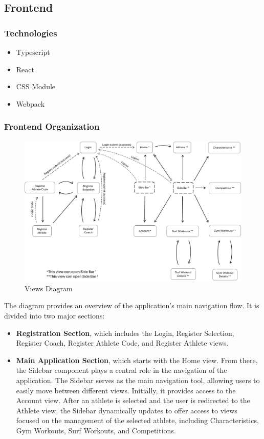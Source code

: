 \documentclass[a4paper,twoside,11pt]{article}
\begin{document}
\subsection{Frontend}

\subsubsection{Technologies}
\begin{itemize}
\item Typescript
\item React
\item CSS Module
\item Webpack
\end{itemize}

\subsubsection{Frontend Organization}

\begin{figure}[H]
\centering
\includegraphics[width=6in]{ViewsDiagram.png}
\caption{Views Diagram}
\end{figure}

The diagram provides an overview of the application's main navigation flow.  
It is divided into two major sections:

\begin{itemize}
\item \textbf{Registration Section}, which includes the Login, Register Selection, Register Coach, Register Athlete Code, and Register Athlete views.
  
\item \textbf{Main Application Section}, which starts with the Home view. From there, the Sidebar component plays a central role in the navigation of the application.  
The Sidebar serves as the main navigation tool, allowing users to easily move between different views.  
Initially, it provides access to the Account view. After an athlete is selected and the user is redirected to the Athlete view, the Sidebar dynamically updates to offer access to views focused on the management of the selected athlete, including Characteristics, Gym Workouts, Surf Workouts, and Competitions.
\end{itemize}
\end{document}
